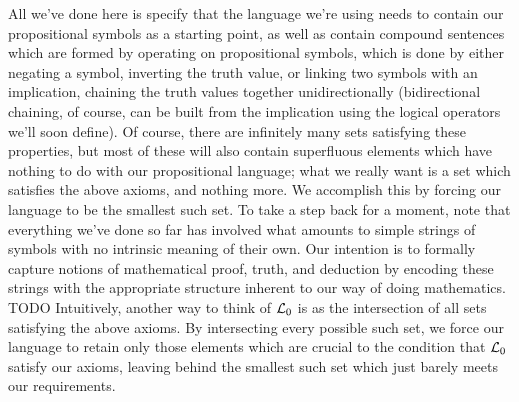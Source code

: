\documentclass{article}
\begin{document}
All we've done here is specify that the language we're using needs to contain our propositional symbols as a starting point, as well as contain compound sentences which are formed by operating on propositional symbols, which is done by either negating a symbol, inverting the truth value, or linking two symbols with an implication, chaining the truth values together unidirectionally (bidirectional chaining, of course, can be built from the implication using the logical operators we'll soon define). Of course, there are infinitely many sets satisfying these properties, but most of these will also contain superfluous elements which have nothing to do with our propositional language; what we really want is a set which satisfies the above axioms, and nothing more. We accomplish this by forcing our language to be the smallest such set.
\nn
To take a step back for a moment, note that everything we've done so far has involved what amounts to simple strings of symbols with no intrinsic meaning of their own. Our intention is to formally capture notions of mathematical proof, truth, and deduction by encoding these strings with the appropriate structure inherent to our way of doing mathematics. TODO
\nn
Intuitively, another way to think of $ \mathcal{L}_0 $ is as the intersection of all sets satisfying the above axioms. By intersecting every possible such set, we force our language to retain only those elements which are crucial to the condition that $ \mathcal{L}_0 $ satisfy our axioms, leaving behind the smallest such set which just barely meets our requirements.
\end{document}
